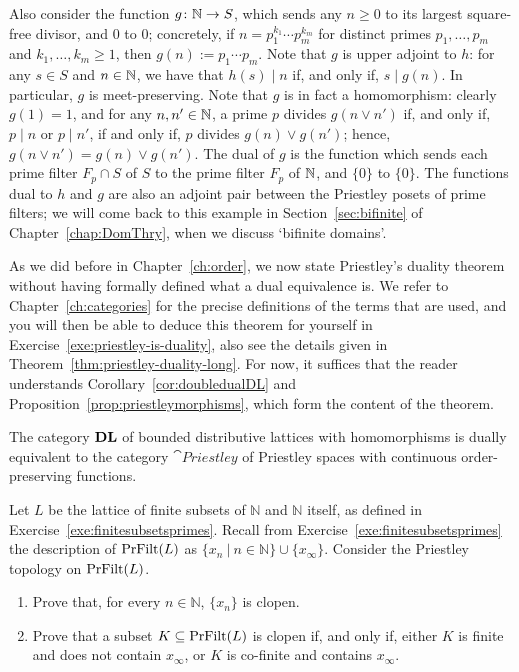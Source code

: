 \begin{example}
Also consider the function $g \colon \mathbb{N} \to S$, which sends any $n \geq 0$ to its largest square-free divisor, and $0$ to $0$; concretely, if $n = p_1^{k_1} \cdots p_m^{k_m}$ for distinct primes $p_1, \dots, p_m$ and $k_1, \dots, k_m \geq 1$, then $g(n) := p_1 \cdots p_m$. Note that $g$ is upper adjoint to $h$: for any $s \in S$ and $n \in \mathbb{N}$, we have that $h(s) \mid n$ if, and only if, $s \mid g(n)$. In particular, $g$ is meet-preserving. Note that $g$ is in fact a homomorphism: clearly $g(1) = 1$, and for any $n, n' \in \mathbb{N}$, a prime $p$ divides $g(n \vee n')$ if, and only if, $p \mid n$ or $p \mid n'$, if and only if, $p$ divides $g(n) \vee g(n')$; hence, $g(n \vee n') = g(n) \vee g(n')$. The dual of $g$ is the function which sends each prime filter $F_p \cap S$ of $S$ to the prime filter $F_p$ of $\mathbb{N}$, and $\{0\}$ to $\{0\}$. The functions dual to $h$ and $g$ are also an adjoint pair between the Priestley posets of prime filters; we will come back to this example in Section~\ref{sec:bifinite} of Chapter~\ref{chap:DomThry}, when we discuss `bifinite domains'.
\end{example}




As we did before in Chapter~\ref{ch:order}, we now state Priestley's duality theorem without having formally defined what a dual equivalence is. We refer to Chapter~\ref{ch:categories} for the precise definitions of the terms that are used, and you will then be able to deduce this theorem for yourself in Exercise~\ref{exe:priestley-is-duality}, also see the details given in Theorem~\ref{thm:priestley-duality-long}. For now, it suffices that the reader understands Corollary~\ref{cor:doubledualDL} and Proposition~\ref{prop:priestleymorphisms}, which form the content of the theorem.
\begin{theorem}\label{thm:priestleyduality}
The category $\mathbf{DL}$ of bounded distributive lattices with homomorphisms is dually equivalent to the category $\cat{Priestley}$ of Priestley spaces with continuous order-preserving functions.
\end{theorem}

\exercises

\begin{exercise}\label{exe:finitesubsetsspace}
  Let $L$ be the lattice of finite subsets of $\mathbb{N}$ and $\mathbb{N}$ itself, as defined in Exercise~\ref{exe:finitesubsetsprimes}. Recall from Exercise~\ref{exe:finitesubsetsprimes} the description of $\mathrm{PrFilt}(L)$ as $\{x_n \ | \ n \in \mathbb{N}\} \cup \{x_\infty\}$. Consider the Priestley topology on $\mathrm{PrFilt}(L)$.
  \begin{enumerate}
  \item Prove that, for every $n \in \mathbb{N}$, $\{x_n\}$ is clopen.
  \item Prove that a subset $K \subseteq \mathrm{PrFilt}(L)$ is clopen if, and only if, either $K$ is finite and does not contain $x_\infty$, or $K$ is co-finite and contains $x_\infty$.
  \end{enumerate}
  \end{exercise}
  


